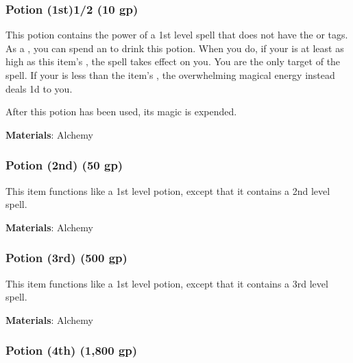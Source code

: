
\lowercase{\hypertarget{item:Potion (1st)}{}}\label{item:Potion (1st)}
\hypertarget{item:Potion (1st)}{\subsubsection{Potion (1st)\hfill1/2 (10 gp)}}

This potion contains the power of a 1st level  spell that does not have the  or  tags.
As a , you can spend an  to drink this potion.
When you do, if your  is at least as high as this item's , the spell takes effect on you.
You are the only target of the spell.
If your  is less than the item's , the overwhelming magical energy instead deals  \minus1d to you.

After this potion has been used, its magic is expended.



\textbf{Materials}: Alchemy


\lowercase{\hypertarget{item:Potion (2nd)}{}}\label{item:Potion (2nd)}
\hypertarget{item:Potion (2nd)}{\subsubsection{Potion (2nd)\hfill{} (50 gp)}}

This item functions like a 1st level potion, except that it contains a 2nd level spell.



\textbf{Materials}: Alchemy


\lowercase{\hypertarget{item:Potion (3rd)}{}}\label{item:Potion (3rd)}
\hypertarget{item:Potion (3rd)}{\subsubsection{Potion (3rd)\hfill{} (500 gp)}}

This item functions like a 1st level potion, except that it contains a 3rd level spell.



\textbf{Materials}: Alchemy


\lowercase{\hypertarget{item:Potion (4th)}{}}\label{item:Potion (4th)}
\hypertarget{item:Potion (4th)}{\subsubsection{Potion (4th)\hfill{} (1,800 gp)}}

